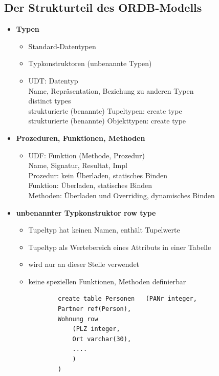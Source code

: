 \subsection{Der Strukturteil des ORDB-Modells}
\begin{itemize}
	\item \textbf{Typen}
	\begin{itemize}
		\item Standard-Datentypen
		\item Typkonstruktoren (unbenannte Typen)
		\item UDT: Datentyp \\
		Name, Repräsentation, Beziehung zu anderen Typen\\
		distinct types\\
		strukturierte (benannte) Tupeltypen: create type\\
		strukturierte (benannte) Objekttypen: create type
	\end{itemize}
	\item \textbf{Prozeduren, Funktionen, Methoden}
	\begin{itemize}
		\item UDF: Funktion (Methode, Prozedur)\\
		Name, Signatur, Resultat, Impl\\
		Prozedur: kein Überladen, statisches Binden\\
		Funktion: Überladen, statisches Binden\\
		Methoden: Überladen und Overriding, dynamisches Binden
	\end{itemize}
	
	\item \textbf{unbenannter Typkonstruktor row type}
	\begin{itemize}
		\item Tupeltyp hat keinen Namen, enthält Tupelwerte
		\item Tupeltyp als Wertebereich eines Attributs in einer Tabelle
		\item wird nur an dieser Stelle verwendet
		\item keine speziellen Funktionen, Methoden definierbar
		\begin{lstlisting}
		create table Personen	(PANr integer,
		Partner ref(Person),
		Wohnung row
			(PLZ integer, 
			Ort varchar(30),
			....
			)
		)
		\end{lstlisting}
	\end{itemize}
	

\end{itemize}
